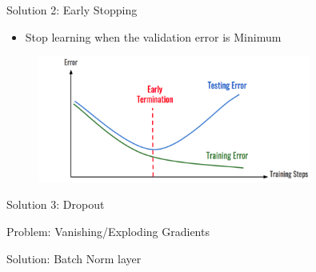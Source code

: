 \begin{frame}{Solution 2: Early Stopping}
    \begin{itemize}
        \item Stop learning when the validation error is Minimum
    \end{itemize}
    \begin{figure}[H]
	\centering
        \href{https://medium.com/analytics-vidhya/early-stopping-with-pytorch-to-restrain-your-model-from-overfitting-dce6de4081c5}{\includegraphics[width=0.8\textwidth]{Figs/Early Stopping.png}}
    \end{figure}
\end{frame}

\begin{frame}{Solution 3: Dropout}
    
\end{frame}

\begin{frame}{Problem: Vanishing/Exploding Gradients}
    
\end{frame}

\begin{frame}{Solution: Batch Norm layer}
    
\end{frame}


